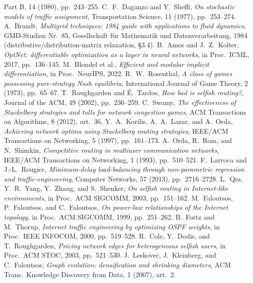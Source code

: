 \documentclass[ijoc]{informs3}
\begin{document}
\begin{thebibliography}{}
Part B, 14 (1980), pp.~243--255.
 C.~F.~Daganzo and Y.~Sheffi, \emph{On stochastic models of traffic assignment},
Transportation Science, 11 (1977), pp.~253--274.
 A.~Brandt, \emph{Multigrid techniques: 1984 guide with applications to fluid dynamics},
GMD-Studien Nr.~85, Gesellschaft f\"ur Mathematik und Datenverarbeitung, 1984 (distributive/distribution-matrix
relaxation, \S3.4).
 B.~Amos and J.~Z.~Kolter, \emph{OptNet: differentiable optimization as a layer in neural
networks}, in Proc.\ ICML, 2017, pp.~136--145.
 M.~Blondel et al., \emph{Efficient and modular implicit differentiation}, in Proc.\
NeurIPS, 2022.
 R.~W.~Rosenthal, \emph{A class of games possessing pure-strategy Nash equilibria},
International Journal of Game Theory, 2 (1973), pp.~65--67.
 T.~Roughgarden and \'E.~Tardos, \emph{How bad is selfish routing?}, Journal of the
ACM, 49 (2002), pp.~236--259.
 C.~Swamy, \emph{The effectiveness of Stackelberg strategies and tolls for network congestion
games}, ACM Transactions on Algorithms, 8 (2012), art.~36.
 Y.~A.~Korilis, A.~A.~Lazar, and A.~Orda, \emph{Achieving network optima using Stackelberg
routing strategies}, IEEE/ACM Transactions on Networking, 5 (1997), pp.~161--173.
\bibitem[Orda et al.(1993)]{orda1993} A.~Orda, R.~Rom, and N.~Shimkin, \emph{Competitive routing in multiuser communication
networks}, IEEE/ACM Transactions on Networking, 1 (1993), pp.~510--521.
\bibitem[Larroca and Rougier(2013)]{larroca2013} F.~Larroca and J.-L.~Rougier, \emph{Minimum-delay load-balancing through non-parametric
regression and traffic-engineering}, Computer Networks, 57 (2013), pp.~2716--2728.
\bibitem[Qiu et al.(2003)]{qiu2003} L.~Qiu, Y.~R.~Yang, Y.~Zhang, and S.~Shenker, \emph{On selfish routing in Internet-like
environments}, in Proc.\ ACM SIGCOMM, 2003, pp.~151--162.
 M.~Faloutsos, P.~Faloutsos, and C.~Faloutsos, \emph{On power-law relationships of the
Internet topology}, in Proc.\ ACM SIGCOMM, 1999, pp.~251--262.
 B.~Fortz and M.~Thorup, \emph{Internet traffic engineering by optimizing OSPF weights}, in
Proc.\ IEEE INFOCOM, 2000, pp.~519--528.
 R.~Cole, Y.~Dodis, and T.~Roughgarden, \emph{Pricing network edges for heterogeneous selfish
users}, in Proc.\ ACM STOC, 2003, pp.~521--530.
 J.~Leskovec, J.~Kleinberg, and C.~Faloutsos, \emph{Graph evolution: densification and
shrinking diameters}, ACM Trans.\ Knowledge Discovery from Data, 1 (2007), art.~2.
\end{thebibliography}
\end{document}
